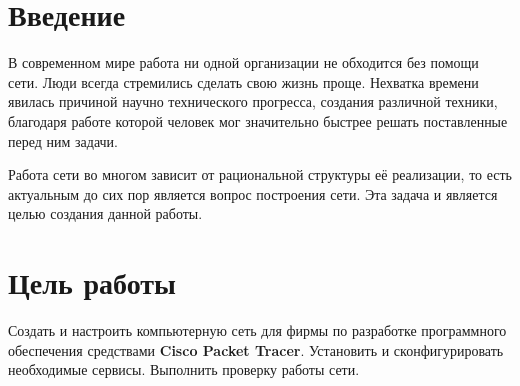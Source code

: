


\tableofcontents
\clearpage

%
\section*{Введение}
В современном мире работа ни одной организации не обходится без помощи сети. Люди
всегда стремились сделать свою жизнь проще. Нехватка времени явилась причиной
научно технического прогресса, создания различной техники, благодаря работе
которой человек мог значительно быстрее решать поставленные перед ним задачи.

Работа сети во многом зависит от рациональной структуры её реализации, то есть актуальным до сих пор является вопрос построения сети. Эта задача и является целью создания данной работы.

\section{Цель работы}
Создать и настроить компьютерную сеть для фирмы по разработке программного обеспечения средствами \textbf{Cisco Packet Tracer}. Установить и сконфигурировать необходимые сервисы. Выполнить проверку работы сети.

